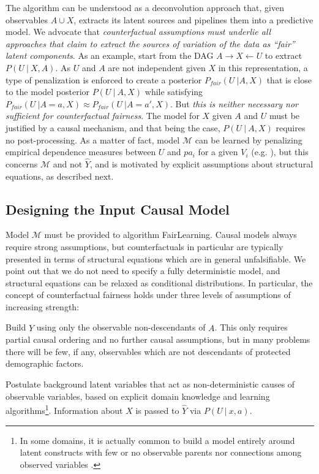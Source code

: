  The algorithm can be
understood as a deconvolution approach that, given observables $A \cup
X$, extracts its latent sources and pipelines them into a predictive
model. We advocate that \emph{counterfactual assumptions must underlie
  all approaches that claim to extract the sources of variation of the
  data as ``fair'' latent components}. As an example,
\citet{louizos2015variational} start from the DAG $A \rightarrow X
\leftarrow U$ to extract $P(U\ |\ X, A)$. As $U$ and $A$ are not
independent given $X$ in this representation, a type of penalization
is enforced to create a posterior $P_{fair}(U\ | A, X)$ that is close
to the model posterior $P(U\ |\ A, X)$ while satisfying $P_{fair}(U\ |
A = a, X) \approx P_{fair}(U\ | A = a', X)$. But {\it this is neither
  necessary nor sufficient for counterfactual fairness}. The model for
$X$ given $A$ and $U$ must be justified by a causal mechanism, and
that being the case, $P(U\ |\ A, X)$ requires no post-processing. As a
matter of fact, model $\mathcal M$ can be learned by penalizing
empirical dependence measures between $U$ and $pa_i$ for a given $V_i$
(e.g. \citet{mooij:09}), but this concerns $\mathcal M$ and not $\hat Y$,
and is motivated by explicit assumptions about structural equations,
as described next.

\subsection{Designing the Input Causal Model}
\label{sec:limit-guide-model}

Model $\mathcal M$ must be provided to algorithm {\sc FairLearning}.
Causal models always require strong assumptions, but counterfactuals
in particular are typically presented in terms of structural equations
which are in general unfalsifiable. We point out that we do not need
to specify a fully deterministic model, and structural equations can
be relaxed as conditional distributions. In particular, the concept of
counterfactual fairness holds under three levels of assumptions of
increasing strength:

  Build $\hat Y$ using only the observable
non-descendants of $A$.  This only requires partial causal ordering
and no further causal assumptions, but in many problems there will be
few, if any, observables which are not descendants of protected
demographic factors.
  
 Postulate background latent variables that
act as non-deterministic causes of observable variables, based on
explicit domain knowledge and learning algorithms\footnote{In some
  domains, it is actually common to build a model entirely around
  latent constructs with few or no observable parents nor connections
  among observed variables \citep{bol:89}.}. Information about $X$ is
passed to $\hat Y$ via $P(U\ |\ x, a)$.

